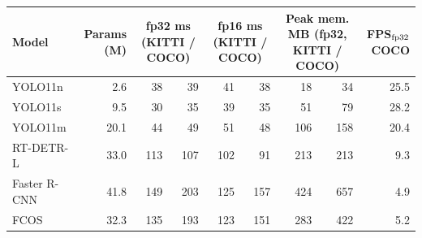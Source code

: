 \begin{tabular}{lrrrrrrrr}
\toprule
Model & Params (M) & \multicolumn{2}{c}{fp32 ms (KITTI / COCO)} & \multicolumn{2}{c}{fp16 ms (KITTI / COCO)} & \multicolumn{2}{c}{Peak mem. MB (fp32, KITTI / COCO)} & FPS$_{\rm fp32}$ COCO \\
\midrule
YOLO11n & 2.6 & 38 & 39 & 41 & 38 & 18 & 34 & 25.5 \\
YOLO11s & 9.5 & 30 & 35 & 39 & 35 & 51 & 79 & 28.2 \\
YOLO11m & 20.1 & 44 & 49 & 51 & 48 & 106 & 158 & 20.4 \\
RT-DETR-L & 33.0 & 113 & 107 & 102 & 91 & 213 & 213 & 9.3 \\
Faster R-CNN & 41.8 & 149 & 203 & 125 & 157 & 424 & 657 & 4.9 \\
FCOS & 32.3 & 135 & 193 & 123 & 151 & 283 & 422 & 5.2 \\
\bottomrule
\end{tabular}

